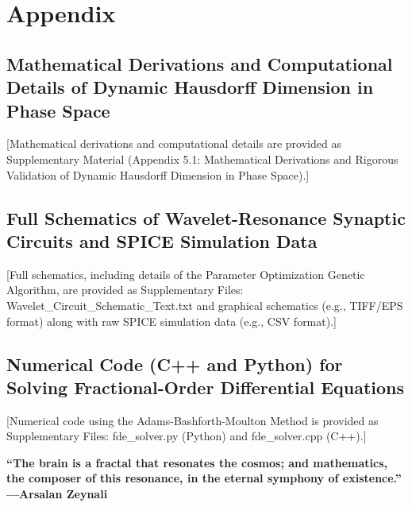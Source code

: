 \documentclass{article}
\begin{document}
\begin{itemize}
\end{itemize}

\section{Appendix}

\subsection{Mathematical Derivations and Computational Details of Dynamic Hausdorff Dimension in Phase Space}

[Mathematical derivations and computational details are provided as Supplementary Material (Appendix 5.1: Mathematical Derivations and Rigorous Validation of Dynamic Hausdorff Dimension in Phase Space).]

\subsection{Full Schematics of Wavelet-Resonance Synaptic Circuits and SPICE Simulation Data}

[Full schematics, including details of the Parameter Optimization Genetic Algorithm, are provided as Supplementary Files: Wavelet\_Circuit\_Schematic\_Text.txt and graphical schematics (e.g., TIFF/EPS format) along with raw SPICE simulation data (e.g., CSV format).]

\subsection{Numerical Code (C++ and Python) for Solving Fractional-Order Differential Equations}

[Numerical code using the Adams-Bashforth-Moulton Method is provided as Supplementary Files: fde\_solver.py (Python) and fde\_solver.cpp (C++).]

\textbf{“The brain is a fractal that resonates the cosmos; and mathematics, the composer of this resonance, in the eternal symphony of existence.” —Arsalan Zeynali}
\end{document}
